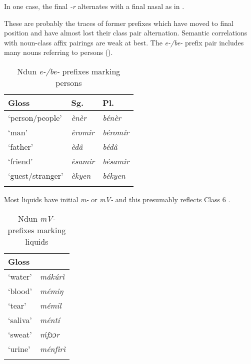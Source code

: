 \documentclass[output=paper]{langsci/langscibook}
\begin{document}
 In one case, the final \textit{-r} alternates with a final nasal as in .



These are probably the traces of former prefixes which have moved to final position and have almost lost their class pair alternation. Semantic correlations with noun-class affix pairings are weak at best. The \textit{e-/be-} prefix pair includes many nouns referring to persons ().


\begin{table}
\caption{Ndun \textit{e-/be-} prefixes marking persons}
\label{extab:nomaffplat:33}
\begin{tabularx}{.8\textwidth}{XXl} 
\lsptoprule
Gloss 	& {Sg.} 	& {Pl.}\\
\midrule
‘person/people’ 	&  \itshape ènèr 	&  \itshape bénèr\\
‘man’ 	&  \itshape èromir 	&  \itshape béromír\\
‘father’ 	&  \itshape èdâ 	&  \itshape bédâ\\
‘friend’ 	&  \itshape èsamir 	&  \itshape bésamir\\
‘guest/stranger’ 	&  \itshape èkyen 	&  \itshape békyen\\
\lspbottomrule
\end{tabularx}
\end{table}

Most liquids have initial \textit{m-} or  \textit{mV-} and this presumably reflects  Class 6 . 

\begin{table}
\caption{Ndun \textit{mV-} prefixes marking liquids}
\label{extab:nomaffplat:34}
\begin{tabularx}{.66\textwidth}{Xl}
\lsptoprule
Gloss 	&  {\ilit{Ndun}}\\
\midrule
‘water’ 	&  \itshape mákúrì\\
‘blood’ 	&  \itshape mémiŋ\\
‘tear’ 	&  \itshape mémil\\
‘saliva’ 	&  \textit{méntí} \\
‘sweat’ 	&  \itshape ḿfɔɔr\\
‘urine’ 	&  \itshape ménfìrì\\
\lspbottomrule
\end{tabularx}
\end{table}
\end{document}
